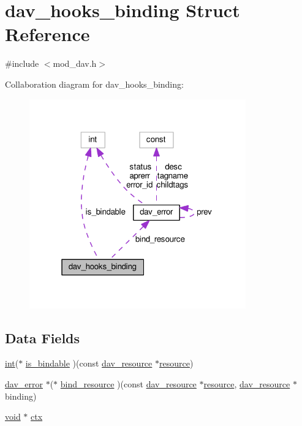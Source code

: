\hypertarget{structdav__hooks__binding}{}\section{dav\+\_\+hooks\+\_\+binding Struct Reference}
\label{structdav__hooks__binding}


{\ttfamily \#include $<$mod\+\_\+dav.\+h$>$}



Collaboration diagram for dav\+\_\+hooks\+\_\+binding\+:
\nopagebreak
\begin{figure}[H]
\begin{center}
\leavevmode
\includegraphics[width=265pt]{structdav__hooks__binding__coll__graph}
\end{center}
\end{figure}
\subsection*{Data Fields}
\begin{DoxyCompactItemize}
\item 
\hyperlink{pcre_8txt_a42dfa4ff673c82d8efe7144098fbc198}{int}($\ast$ \hyperlink{structdav__hooks__binding_a89e4c0f2a77605a07f516b97a8ce1b53}{is\+\_\+bindable} )(const \hyperlink{structdav__resource}{dav\+\_\+resource} $\ast$\hyperlink{group__APR__Util__RL_gaa6244aacafcc4ec1d0727bdb32614b11}{resource})
\item 
\hyperlink{structdav__error}{dav\+\_\+error} $\ast$($\ast$ \hyperlink{structdav__hooks__binding_a4ad46af410100f691fc09c896e14d2d2}{bind\+\_\+resource} )(const \hyperlink{structdav__resource}{dav\+\_\+resource} $\ast$\hyperlink{group__APR__Util__RL_gaa6244aacafcc4ec1d0727bdb32614b11}{resource}, \hyperlink{structdav__resource}{dav\+\_\+resource} $\ast$binding)
\item 
\hyperlink{group__MOD__ISAPI_gacd6cdbf73df3d9eed42fa493d9b621a6}{void} $\ast$ \hyperlink{structdav__hooks__binding_a0a8be30bc02a9f5463b69e25db878fc2}{ctx}
\end{DoxyCompactItemize}


